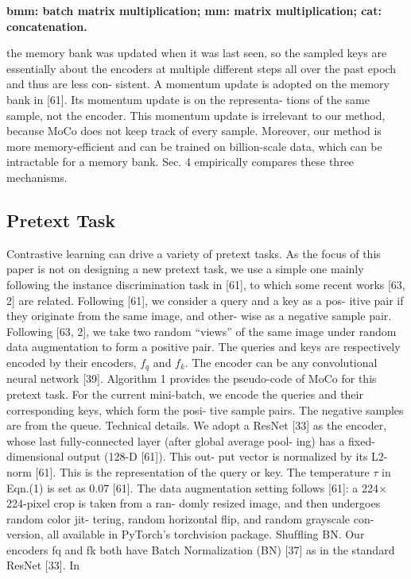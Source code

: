 \documentclass[10pt,twocolumn]{article}  %
\begin{document}
\textbf{\small bmm: batch matrix multiplication; mm: matrix multiplication; cat: concatenation.}

the memory bank was updated when it was last seen, so the
sampled keys are essentially about the encoders at multiple
different steps all over the past epoch and thus are less con-
sistent. A momentum update is adopted on the memory
bank in [61]. Its momentum update is on the representa-
tions of the same sample, not the encoder. This momentum
update is irrelevant to our method, because MoCo does not
keep track of every sample. Moreover, our method is more
memory-efficient and can be trained on billion-scale data,
which can be intractable for a memory bank.
Sec. 4 empirically compares these three mechanisms.

\subsection{Pretext Task}
Contrastive learning can drive a variety of pretext tasks.
As the focus of this paper is not on designing a new pretext
task, we use a simple one mainly following the instance
discrimination task in [61], to which some recent works [63,
2] are related.
Following [61], we consider a query and a key as a pos-
itive pair if they originate from the same image, and other-
wise as a negative sample pair. Following [63, 2], we take
two random “views” of the same image under random data
augmentation to form a positive pair. The queries and keys
are respectively encoded by their encoders, $f_q$ and $f_k$. The
encoder can be any convolutional neural network [39].
Algorithm 1 provides the pseudo-code of MoCo for this
pretext task. For the current mini-batch, we encode the
queries and their corresponding keys, which form the posi-
tive sample pairs. The negative samples are from the queue.
Technical details. We adopt a ResNet [33] as the encoder,
whose last fully-connected layer (after global average pool-
ing) has a ﬁxed-dimensional output (128-D [61]). This out-
put vector is normalized by its L2-norm [61]. This is the
representation of the query or key. The temperature $\tau$ in
Eqn.(1) is set as 0.07 [61]. The data augmentation setting
follows [61]: a 224$\times$224-pixel crop is taken from a ran-
domly resized image, and then undergoes random color jit-
tering, random horizontal ﬂip, and random grayscale con-
version, all available in PyTorch's torchvision package.
Shufﬂing BN. Our encoders fq and fk both have Batch
Normalization (BN) [37] as in the standard ResNet [33]. In
\end{document}
